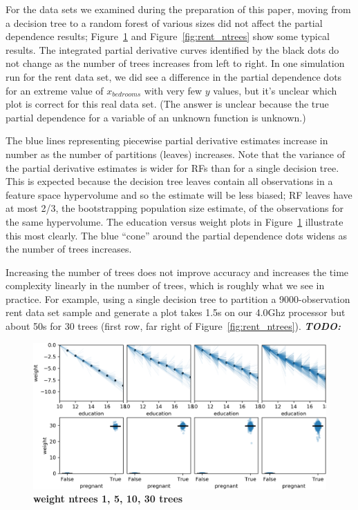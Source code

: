 \documentclass[12pt]{article}
\newcommand{\figref}[1]{Figure~\ref{#1}}
\newcommand{\todo}[1]{{\bf\em TODO:} {{\color{red}{#1}}}}
\begin{document}
For the data sets we examined during the preparation of this paper, moving from a decision tree to a random forest of various sizes did not affect the partial dependence results; \figref{fig:weight_ntrees} and \figref{fig:rent_ntrees} show some typical results. The integrated partial derivative curves identified by the black dots do not change as the number of trees increases from left to right.  In one simulation run for the rent data set, we did see a difference in the partial dependence dots for an extreme value of $x_{bedrooms}$ with very few $y$ values, but it's unclear which plot is correct for this real data set. (The answer is unclear because the true partial dependence for a variable of an unknown function is unknown.)

The blue lines representing piecewise partial derivative estimates increase in number as the number of partitions (leaves) increases.  Note that the variance of the partial derivative estimates is wider for RFs than for a single decision tree. This is expected because the decision tree leaves contain all observations in a feature space hypervolume and so the estimate will be less biased; RF leaves have at most 2/3, the bootstrapping population size estimate, of the observations for the same hypervolume. The education versus weight plots in \figref{fig:weight_ntrees} illustrate this most clearly. The blue ``cone'' around the partial dependence dots widens as the number of trees increases.  

Increasing the number of trees does not improve accuracy and increases the time complexity linearly in the number of trees, which is roughly what we see in practice.  For example, using a single decision tree to partition a 9000-observation rent data set sample and generate a plot takes 1.5s on our 4.0Ghz processor but about 50s for 30 trees (first row, far right of \figref{fig:rent_ntrees}). \todo{seems less accuarate with bootstrap}

\begin{figure}[htbp]
\begin{center}
\includegraphics[scale=0.5]{images/height_pregnant_vs_weight_ntrees.png}
\caption{{\bf  weight ntrees 1, 5, 10, 30 trees}}
\label{fig:weight_ntrees}
\end{center}
\end{figure}
\end{document}
